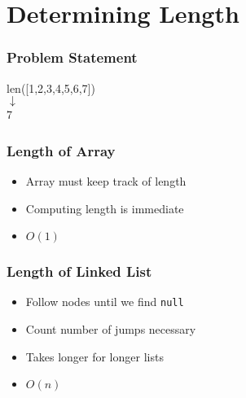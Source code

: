 \section{Determining Length}

\frame{\tableofcontents[currentsection]}

\begin{frame}
    \frametitle{Problem Statement}
    \begin{center}\ttfamily
        len([1,2,3,4,5,6,7]) \\[4mm]
        $\downarrow$ \\[4mm]
        7
    \end{center}
\end{frame}

\begin{frame}
    \frametitle{Length of Array}
    \begin{itemize}
        \item Array must keep track of  length
        \item Computing length is immediate
        \item $O(1)$
    \end{itemize}
\end{frame}

\begin{frame}
    \frametitle{Length of Linked List}
    \begin{center}
    \end{center}
    \vskip4mm
    \begin{itemize}
        \item Follow nodes until we find \texttt{null}
        \item Count number of jumps necessary
        \item Takes longer for longer lists
        \item $O(n)$
    \end{itemize}
\end{frame}